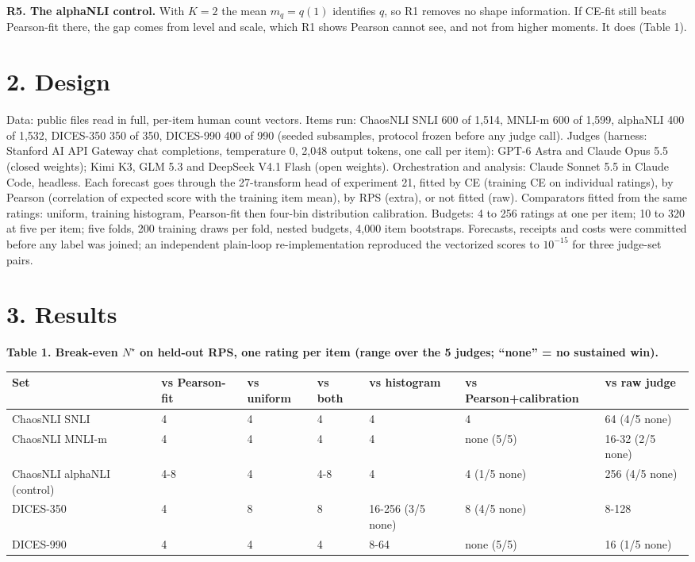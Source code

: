 \documentclass[10pt]{article}
\begin{document}
\textbf{R5. The alphaNLI control.} With $K=2$ the mean $m_q=q(1)$ identifies $q$, so R1 removes no shape information. If CE-fit still beats Pearson-fit there, the gap comes from level and scale, which R1 shows Pearson cannot see, and not from higher moments. It does (Table 1).


\section*{2. Design}
Data: public files read in full, per-item human count vectors. Items run: ChaosNLI SNLI 600 of 1,514, MNLI-m 600 of 1,599, alphaNLI 400 of 1,532, DICES-350 350 of 350, DICES-990 400 of 990 (seeded subsamples, protocol frozen before any judge call). 
Judges (harness: Stanford AI API Gateway chat completions, temperature 0, 2,048 output tokens, one call per item): GPT-6 Astra and Claude Opus 5.5 (closed weights); Kimi K3, GLM 5.3 and DeepSeek V4.1 Flash (open weights). Orchestration and analysis: Claude Sonnet 5.5 in Claude Code, headless. 
Each forecast goes through the 27-transform head of experiment 21, fitted by CE (training CE on individual ratings), by Pearson (correlation of expected score with the training item mean), by RPS (extra), or not fitted (raw). Comparators fitted from the same ratings: uniform, training histogram, Pearson-fit then four-bin distribution calibration. 
Budgets: 4 to 256 ratings at one per item; 10 to 320 at five per item; five folds, 200 training draws per fold, nested budgets, 4,000 item bootstraps. Forecasts, receipts and costs were committed before any label was joined; an independent plain-loop re-implementation reproduced the vectorized scores to $10^{-15}$ for three judge-set pairs.

\section*{3. Results}
\textbf{Table 1. Break-even $N^\star$ on held-out RPS, one rating per item (range over the 5 judges; ``none'' = no sustained win).}\par
\footnotesize
\begin{tabular}{lllllll}\toprule
Set & vs Pearson-fit & vs uniform & vs both & vs histogram & vs Pearson+calibration & vs raw judge \\ \midrule
ChaosNLI SNLI & 4 & 4 & 4 & 4 & 4 & 64 (4/5 none) \\
ChaosNLI MNLI-m & 4 & 4 & 4 & 4 & none (5/5) & 16-32 (2/5 none) \\
ChaosNLI alphaNLI (control) & 4-8 & 4 & 4-8 & 4 & 4 (1/5 none) & 256 (4/5 none) \\
DICES-350 & 4 & 8 & 8 & 16-256 (3/5 none) & 8 (4/5 none) & 8-128 \\
DICES-990 & 4 & 4 & 4 & 8-64 & none (5/5) & 16 (1/5 none) \\
\bottomrule\end{tabular}
\end{document}
